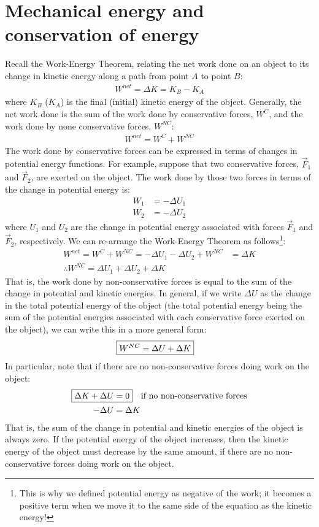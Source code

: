\section{Mechanical energy and conservation of energy}
Recall the Work-Energy Theorem, relating the net work done on an object to its change in kinetic energy along a path from point $A$ to point $B$:
\begin{align*}
W^{net}=\Delta K = K_B - K_A
\end{align*}
where $K_B$ ($K_A$) is the final (initial) kinetic energy of the object. Generally, the net work done is the sum of the work done by conservative forces, $W^C$, and the work done by none conservative forces, $W^{NC}$:
\begin{align*}
W^{net}=W^C+W^{NC}
\end{align*}
The work done by conservative forces can be expressed in terms of changes in potential energy functions. For example, suppose that two conservative forces, $\vec F_1$ and $\vec F_2$, are exerted on the object. The work done by those two forces in terms of the change in potential energy is:
\begin{align*}
W_1 &= -\Delta U_1\\
W_2 &= -\Delta U_2
\end{align*}
where $U_1$ and $U_2$ are the change in potential energy associated with forces $\vec F_1$ and $\vec F_2$, respectively. We can re-arrange the Work-Energy Theorem as follows\footnote{This is why we defined potential energy as negative of the work; it becomes a positive term when we move it to the same side of the equation as the kinetic energy!}:
\begin{align*}
W^{net}=W^C+W^{NC}=-\Delta U_1 - \Delta U_2 +W^{NC} &= \Delta K\\
\therefore W^{NC} = \Delta U_1 + \Delta U_2 + \Delta K
\end{align*}
That is, the work done by non-conservative forces is equal to the sum of the change in potential and kinetic energies. In general, if we write $\Delta U$ as the change in the total potential energy of the object (the total potential energy being the sum of the potential energies associated with each conservative force exerted on the object), we can write this in a more general form:
\begin{align}
\Aboxed{W^{NC}=\Delta U + \Delta K}
\end{align}
In particular, note that if there are no non-conservative forces doing work on the object:
\begin{align}
\Aboxed{\Delta K + \Delta U &= 0}\quad\text{if no non-conservative forces}\\
-\Delta U &= \Delta K \nonumber
\end{align}
That is, the sum of the change in potential and kinetic energies of the object is always zero. If the potential energy of the object increases, then the kinetic energy of the object must decrease by the same amount, if there are no non-conservative forces doing work on the object.

